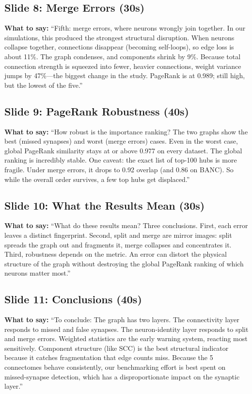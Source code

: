 \documentclass[11pt]{article}
\begin{document}
\subsection*{Slide 8: Merge Errors (30s)}
\textbf{What to say:} 
``Fifth: merge errors, where neurons wrongly join together. In our simulations, this produced the strongest structural disruption. When neurons collapse together, connections disappear (becoming self-loops), so edge loss is about 11\%. The graph condenses, and components shrink by 9\%. Because total connection strength is squeezed into fewer, heavier connections, weight variance jumps by 47\%---the biggest change in the study. PageRank is at 0.989; still high, but the lowest of the five.''

\subsection*{Slide 9: PageRank Robustness (40s)}
\textbf{What to say:} 
``How robust is the importance ranking? The two graphs show the best (missed synapses) and worst (merge errors) cases. Even in the worst case, global PageRank similarity stays at or above 0.977 on every dataset. The global ranking is incredibly stable. One caveat: the exact list of top-100 hubs is more fragile. Under merge errors, it drops to 0.92 overlap (and 0.86 on BANC). So while the overall order survives, a few top hubs get displaced.''

\subsection*{Slide 10: What the Results Mean (30s)}
\textbf{What to say:} 
``What do these results mean? Three conclusions. First, each error leaves a distinct fingerprint. Second, split and merge are mirror images: split spreads the graph out and fragments it, merge collapses and concentrates it. Third, robustness depends on the metric. An error can distort the physical structure of the graph without destroying the global PageRank ranking of which neurons matter most.''

\subsection*{Slide 11: Conclusions (40s)}
\textbf{What to say:} 
``To conclude: The graph has two layers. The connectivity layer responds to missed and false synapses. The neuron-identity layer responds to split and merge errors. Weighted statistics are the early warning system, reacting most sensitively. Component structure (like SCC) is the best structural indicator because it catches fragmentation that edge counts miss. Because the 5 connectomes behave consistently, our benchmarking effort is best spent on missed-synapse detection, which has a disproportionate impact on the synaptic layer.''
\end{document}
